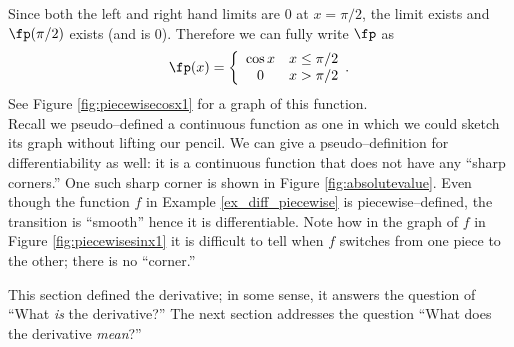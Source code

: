 {%
Since both the left and right hand limits are 0 at $x=\pi/2$, the limit exists and $\fp(\pi/2)$ exists (and is 0). Therefore we can fully write $\fp$ as 
\[
\fp(x) = \left\{\begin{array}{cc} \cos x & x\leq\pi/2\\ 0 & x>\pi/2\end{array}.\right.
\]
 See Figure \ref{fig:piecewisecosx1} for a graph of this function.
}\\

Recall we pseudo--defined a continuous function as one in which we could sketch its graph without lifting our pencil. We can give a pseudo--definition for differentiability as well: it is a continuous function that does not have any ``sharp corners.'' One such sharp corner is shown in Figure \ref{fig:absolutevalue}. Even though the function $f$ in Example \ref{ex_diff_piecewise} is piecewise--defined, the transition is ``smooth'' hence it is differentiable. Note how in the graph of $f$ in Figure \ref{fig:piecewisesinx1} it is difficult to tell when $f$ switches from one piece to the other; there is no ``corner.''

This section defined the derivative; in some sense, it answers the question of ``What \textit{is} the derivative?'' The next section addresses the question ``What does the derivative \textit{mean}?''



